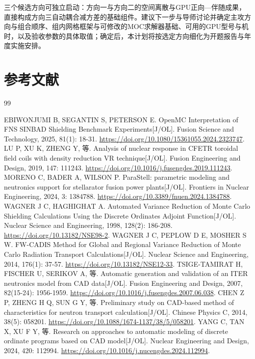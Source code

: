 \documentclass[UTF8, zihao=-4, fontset=none, a4paper]{ctexart}
\begin{document}
三个候选方向可独立启动：方向一与方向二的空间离散与GPU正向---伴随成果，直接构成方向三自动耦合减方差的基础组件。建议下一步与导师讨论并确定主攻方向与组合顺序、组内网格框架与可修改的MOC求解器基础、可用的GPU型号与机时，以及验收参数的具体取值；确定后，本计划将按选定方向细化为开题报告与年度实施安排。

\clearpage
{}
{}
\section*{参考文献}
\begin{thebibliography}{99}
\setlength{\itemsep}{3pt}
\raggedright
\small
{} EBIWONJUMI B, SEGANTIN S, PETERSON E. OpenMC Interpretation of FNS SINBAD Shielding Benchmark Experiments{[}J/OL{]}. Fusion Science and Technology, 2025, 81(1): 18-31. \url{https://doi.org/10.1080/15361055.2024.2323747}.
 LU P, XU K, ZHENG Y, 等. Analysis of nuclear response in CFETR toroidal field coils with density reduction VR technique{[}J/OL{]}. Fusion Engineering and Design, 2019, 147: 111243. \url{https://doi.org/10.1016/j.fusengdes.2019.111243}.
 MORENO C, BADER A, WILSON P. ParaStell: parametric modeling and neutronics support for stellarator fusion power plants{[}J/OL{]}. Frontiers in Nuclear Engineering, 2024, 3: 1384788. \url{https://doi.org/10.3389/fnuen.2024.1384788}.
 WAGNER J C, HAGHIGHAT A. Automated Variance Reduction of Monte Carlo Shielding Calculations Using the Discrete Ordinates Adjoint Function{[}J/OL{]}. Nuclear Science and Engineering, 1998, 128(2): 186-208. \url{https://doi.org/10.13182/NSE98-2}.
 WAGNER J C, PEPLOW D E, MOSHER S W. FW-CADIS Method for Global and Regional Variance Reduction of Monte Carlo Radiation Transport Calculations{[}J/OL{]}. Nuclear Science and Engineering, 2014, 176(1): 37-57. \url{https://doi.org/10.13182/NSE12-33}.
 TSIGE-TAMIRAT H, FISCHER U, SERIKOV A, 等. Automatic generation and validation of an ITER neutronics model from CAD data{[}J/OL{]}. Fusion Engineering and Design, 2007, 82(15-24): 1956-1959. \url{https://doi.org/10.1016/j.fusengdes.2007.06.038}.
 CHEN Z P, ZHENG H Q, SUN G Y, 等. Preliminary study on CAD-based method of characteristics for neutron transport calculation{[}J/OL{]}. Chinese Physics C, 2014, 38(5): 058201. \url{https://doi.org/10.1088/1674-1137/38/5/058201}.
 YANG C, TAN X, XU F Y, 等. Research on approaches to automatic modeling of discrete ordinate programs based on CAD model{[}J/OL{]}. Nuclear Engineering and Design, 2024, 420: 112994. \url{https://doi.org/10.1016/j.nucengdes.2024.112994}.

\end{thebibliography}
\end{document}
